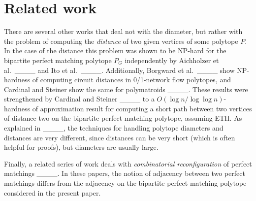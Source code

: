 \section{Related work}
There are several other works that deal not with the diameter, but rather with the problem of computing the \emph{distance} of two given vertices of some polytope $P$.
In the case of the distance this problem was shown to be NP-hard for the bipartite perfect matching polytope $P_G$ independently by Aichholzer et al.\ ____ and Ito et al.\ ____. Additionally, Borgward et al.\ ____ show NP-hardness of computing circuit distances in 0/1-network flow polytopes, and Cardinal and Steiner show the same for polymatroids ____.
These results were strengthened by Cardinal and Steiner ____ to a $O(\log n / \log \log n)$-hardness of approximation result for computing a short path between two 
vertices of distance two on the bipartite perfect matching polytope, assuming ETH.
As explained in ____, the techniques for handling polytope diameters and distances are very different, since distances can be very short (which is often helpful for proofs), 
but diameters are usually large.

Finally, a related series of work deals with \emph{combinatorial reconfiguration} of perfect matchings ____. 
In these papers, the notion of adjacency between two perfect matchings differs from the adjacency on the bipartite perfect matching polytope considered in the present paper.